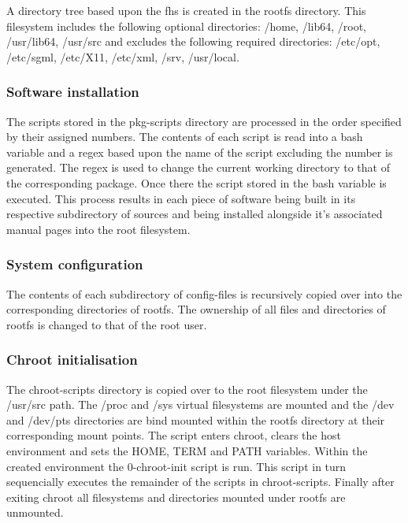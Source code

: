 A directory tree based upon the \gls{fhs} \cite{fhs} is created in the rootfs directory. This filesystem includes the following optional directories: /home, /lib64, /root, /usr/lib64, /usr/src and excludes the following required directories: /etc/opt, /etc/sgml, /etc/X11, /etc/xml, /srv, /usr/local.

\subsubsection{Software installation}

The scripts stored in the pkg-scripts directory are processed in the order specified by their assigned numbers. The contents of each script is read into a bash variable and a \gls{regex} based upon the name of the script excluding the number is generated. The \gls{regex} is used to change the current working directory to that of the corresponding package. Once there the script stored in the bash variable is executed. This process results in each piece of software being built in its respective subdirectory of sources and being installed alongside it's associated manual pages into the root filesystem.


\subsubsection{System configuration}

The contents of each subdirectory of config-files is recursively copied over into the corresponding directories of rootfs. The ownership of all files and directories of rootfs is changed to that of the root user.


\subsubsection{Chroot initialisation}

The chroot-scripts directory is copied over to the root filesystem under the /usr/src path. The /proc and /sys virtual filesystems are mounted and the /dev and /dev/pts directories are bind mounted within the rootfs directory at their corresponding mount points. The script enters chroot, clears the host environment and sets the HOME, TERM and PATH variables. Within the created environment the 0-chroot-init script is run. This script in turn sequencially executes the remainder of the scripts in chroot-scripts. Finally after exiting chroot all filesystems and directories mounted under rootfs are unmounted.

